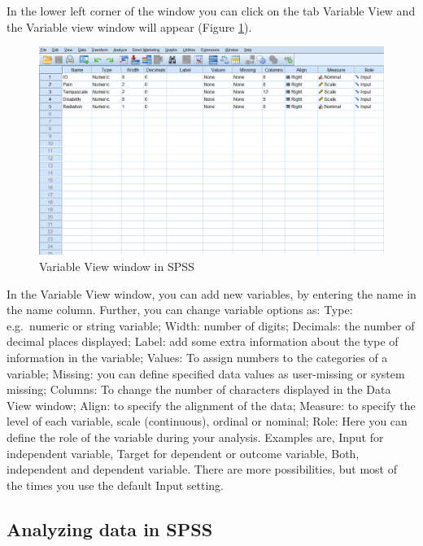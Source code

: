 \documentclass[]{book}
\begin{document}
In the lower left corner of the window you can click on the tab Variable
View and the Variable view window will appear (Figure \ref{fig:fig3}).

\begin{figure}

{\centering \includegraphics[width=0.95\linewidth]{images/fig1.3} 

}

\caption{Variable View window in SPSS}\label{fig:fig3}
\end{figure}

In the Variable View window, you can add new variables, by entering the
name in the name column. Further, you can change variable options as:
Type: e.g.~numeric or string variable; Width: number of digits;
Decimals: the number of decimal places displayed; Label: add some extra
information about the type of information in the variable; Values: To
assign numbers to the categories of a variable; Missing: you can define
specified data values as user-missing or system missing; Columns: To
change the number of characters displayed in the Data View window;
Align: to specify the alignment of the data; Measure: to specify the
level of each variable, scale (continuous), ordinal or nominal; Role:
Here you can define the role of the variable during your analysis.
Examples are, Input for independent variable, Target for dependent or
outcome variable, Both, independent and dependent variable. There are
more possibilities, but most of the times you use the default Input
setting.

\subsection{Analyzing data in SPSS}\label{analyzing-data-in-spss}
\end{document}
